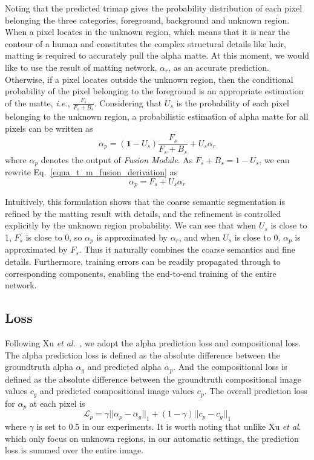 Noting that the predicted trimap gives the probability distribution of each pixel belonging the three categories, foreground, background and unknown region.
When a pixel locates in the unknown region, which means that it is near the contour of a human and constitutes the complex structural details like hair, matting is required to accurately pull the alpha matte.
At this moment, we would like to use the result of matting network, $\alpha_r$, as an accurate prediction.
Otherwise, if a pixel locates outside the unknown region, then the conditional probability of the pixel belonging to the foreground is an appropriate estimation of the matte, \emph{i.e.}, $\frac{F_{s}}{F_{s} + B_{s}}$.
Considering that $U_s$ is the probability of each pixel belonging to the unknown region, a probabilistic estimation of alpha matte for all pixels can be written as
\begin{equation}
\label{equa_t_m_fusion_derivation}
\alpha_{p} = (\textbf{1} - U_{s})\frac{F_{s}}{F_{s} + B_{s}} + U_{s}\alpha_{r}
\end{equation}
where $\alpha_{p}$ denotes the output of \emph{Fusion Module}. As $F_{s} + B_{s} = 1 - U_{s}$, we can rewrite Eq.~\ref{equa_t_m_fusion_derivation} as
\begin{equation}
\label{equa_t_m_fusion}
\alpha_{p} = F_{s} + U_{s}\alpha_{r}
\end{equation}

Intuitively, this formulation shows that the coarse semantic segmentation is refined by the matting result with details, and the refinement is controlled explicitly by the unknown region probability.
We can see that when $U_s$ is close to 1, $F_s$ is close to 0, so $\alpha_p$ is approximated by $\alpha_r$, and
when $U_s$ is close to 0, $\alpha_p$ is approximated by $F_s$.
Thus it naturally combines the coarse semantics and fine details.
Furthermore, training errors can be readily propagated through to corresponding components, enabling the end-to-end training of the entire network.


\subsection{Loss}
Following Xu \emph{et al}.~\cite{xu2017deep}, we adopt the alpha prediction loss and compositional loss.
The alpha prediction loss is defined as the absolute difference between the groundtruth alpha $\alpha_g$ and predicted alpha $\alpha_p$.
And the compositional loss is defined as the absolute difference between the groundtruth compositional image values $c_g$ and predicted compositional image values $c_p$.
The overall prediction loss for $\alpha_p$ at each pixel is
\begin{equation}
\mathcal{L}_p = \gamma ||\alpha_p - \alpha_g||_1 + (1 - \gamma)||c_p - c_g||_1
\end{equation}
where $\gamma$ is set to 0.5 in our experiments.
It is worth noting that unlike Xu \emph{et al}.~\cite{xu2017deep} which only focus on unknown regions, in our automatic settings, the prediction loss is summed over the entire image.

